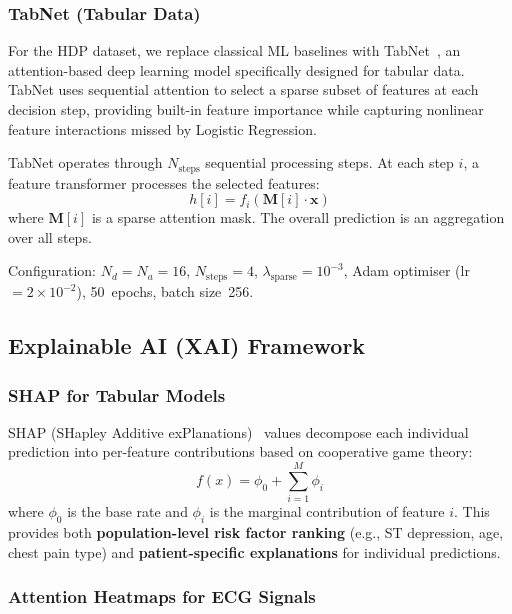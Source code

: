 \documentclass[10pt, twocolumn]{article}
\begin{document}
\subsubsection{TabNet (Tabular Data)}

For the HDP dataset, we replace classical ML baselines with
TabNet~\cite{arik2021}, an attention-based deep learning model specifically designed for
tabular data.
TabNet uses sequential attention to select a sparse subset of features at each decision step,
providing built-in feature importance while capturing nonlinear feature interactions
missed by Logistic Regression.

TabNet operates through $N_{\mathrm{steps}}$ sequential processing steps.
At each step $i$, a feature transformer processes the selected features:
\begin{equation}
  h[i] = f_i\!\left(\mathbf{M}[i] \cdot \mathbf{x}\right)
\end{equation}
where $\mathbf{M}[i]$ is a sparse attention mask.
The overall prediction is an aggregation over all steps.

Configuration: $N_d = N_a = 16$, $N_{\mathrm{steps}} = 4$,
$\lambda_{\mathrm{sparse}} = 10^{-3}$, Adam optimiser (lr~$= 2 \times 10^{-2}$),
50~epochs, batch size~256.

\subsection{Explainable AI (XAI) Framework}

\subsubsection{SHAP for Tabular Models}

SHAP (SHapley Additive exPlanations)~\cite{lundberg2017} values decompose each individual
prediction into per-feature contributions based on cooperative game theory:
\begin{equation}
  f(x) = \phi_0 + \sum_{i=1}^{M} \phi_i
\end{equation}
where $\phi_0$ is the base rate and $\phi_i$ is the marginal contribution of feature $i$.
This provides both \textbf{population-level risk factor ranking}
(e.g., ST depression, age, chest pain type) and \textbf{patient-specific explanations}
for individual predictions.

\subsubsection{Attention Heatmaps for ECG Signals}
\end{document}
